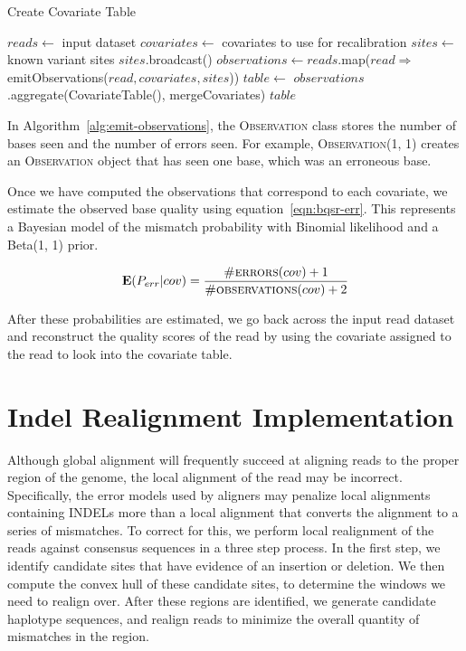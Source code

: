 \documentclass[phd]{ucbthesis}
\begin{document}
\begin{algorithm}
\caption{Create Covariate Table}
\label{alg:create-table}
\begin{algorithmic}
\STATE $reads \leftarrow$ input dataset
\STATE $covariates \leftarrow$ covariates to use for recalibration
\STATE $sites \leftarrow$ known variant sites
\STATE $sites$.broadcast()
\STATE $observations \leftarrow reads$.map($read \Rightarrow$ emitObservations($read, covariates, sites$))
\STATE $table \leftarrow$ $observations$.aggregate(CovariateTable(), mergeCovariates)
\RETURN $table$
\end{algorithmic}
\end{algorithm}

In Algorithm~\ref{alg:emit-observations}, the \textsc{Observation} class stores the number of bases seen
and the number of errors seen. For example, \textsc{Observation(1, 1)} creates an \textsc{Observation} object
that has seen one base, which was an erroneous base.

Once we have computed the observations that correspond to each covariate, we estimate the observed base
quality using equation~\eqref{eqn:bqsr-err}. This represents a Bayesian model of the mismatch probability with
Binomial likelihood and a Beta(1, 1) prior.

\begin{equation}
\label{eqn:bqsr-err}
\mathbf{E}(P_{err}|{cov}) = \frac{\textsc{\#errors}(cov) + 1}{\textsc{\#observations}(cov) + 2}
\end{equation}

After these probabilities are estimated, we go back across the input read dataset and reconstruct the quality
scores of the read by using the covariate assigned to the read to look into the covariate table.

\section{Indel Realignment Implementation}
\label{sec:indel-realignment-implementation}

Although global alignment will frequently succeed at aligning reads to the proper region of the genome, the local
alignment of the read may be incorrect. Specifically, the error models used by aligners may penalize local alignments
containing INDELs more than a local alignment that converts the alignment to a series of mismatches. To correct
for this, we perform local realignment of the reads against consensus sequences in a three step
process. In the first step, we identify candidate sites that have evidence of an insertion or deletion. We then compute
the convex hull of these candidate sites, to determine the windows we need to realign over. After these regions are
identified, we generate candidate haplotype sequences, and realign reads to minimize the overall quantity of mismatches
in the region.
\end{document}
